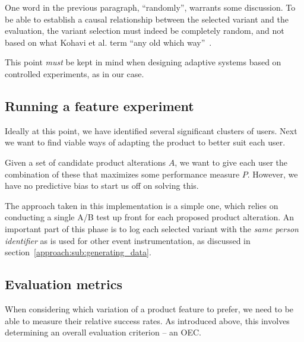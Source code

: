 One word in the previous paragraph, ``randomly'', warrants some discussion. To be able to establish a causal relationship between the selected variant and the evaluation, the variant selection must indeed be completely random, and not based on what Kohavi et al. term ``any old which way''~\cite{Kohavi2007}.

This point \emph{must} be kept in mind when designing adaptive systems based on controlled experiments, as in our case.

\subsection{Running a feature experiment}
\label{approach:running_feature_experiment}

Ideally at this point, we have identified several significant clusters of users. Next we want to find viable ways of adapting the product to better suit each user.

Given a set of candidate product alterations $A$, we want to give each user the combination of these that maximizes some performance measure $P$. However, we have no predictive bias to start us off on solving this.

The approach taken in this implementation is a simple one, which relies on conducting a single A/B test up front for each proposed product alteration. An important part of this phase is to log each selected variant with the \emph{same person identifier} as is used for other event instrumentation, as discussed in section~\ref{approach:sub:generating_data}.


\subsection{Evaluation metrics} %
\label{approach:sec:evaluation_metrics}

When considering which variation of a product feature to prefer, we need to be able to measure their relative success rates. As introduced above, this involves determining an overall evaluation criterion -- an OEC.

